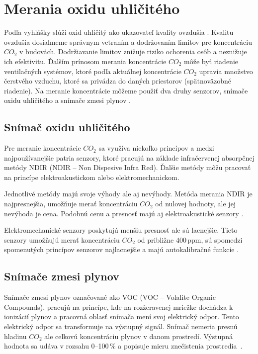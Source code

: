 \chapter{Merania oxidu uhličitého}
Podľa vyhlášky slúži oxid uhličitý ako ukazovateľ kvality ovzdušia \cite{VyhlaskaKvalitaVnutornehoOvzdusiaCO}. Kvalitu ovzdušia dosiahneme správnym vetraním a dodržovaním limitov pre koncentráciu $CO_2$ v budovách. Dodržiavanie limitov znižuje riziko ochorenia osôb a neznižuje ich efektivitu. Ďalším prínosom merania koncentrácie $CO_2$ môže byť riadenie ventilačných systémov, ktoré podľa aktuálnej koncentrácie $CO_2$ upravia množstvo čerstvého vzduchu, ktoré sa privádza do daných priestorov (spätnoväzobné riadenie). Na meranie koncentrácie môžeme použiť dva druhy senzorov, snímače oxidu uhličitého a snímače zmesi plynov \cite{CO2MeraciePristroje}.

\section{Snímač oxidu uhličitého}
 Pre meranie koncentrácie $CO_2$ sa využíva niekoľko princípov a medzi najpoužívanejšie patria senzory, ktoré pracujú na základe infračervenej absorpčnej metódy NDIR (NDIR -- Non Dispesive Infra Red). Ďalšie metódy môžu pracovať na princípe elektroakustickom alebo elektromechanickom. 
 
Jednotlivé metódy majú svoje výhody ale aj nevýhody. Metóda merania NDIR je najpresnejšia, umožňuje merať koncentráciu $CO_2$ od nulovej hodnoty, ale jej nevýhoda je cena. Podobnú cenu a presnosť majú aj elektroakustické senzory \cite{CO2MeraciePristroje}. 

Elektromechanické senzory poskytujú menšiu presnosť ale sú lacnejšie. Tieto senzory umožňujú merať koncentráciu $CO_2$ od približne 400\,ppm, sú spomedzi spomenutých princípov senzorov najlacnejšie a majú autokalibračné funkcie \cite{CO2MeraciePristroje}.
 
 \section{Snímače zmesi plynov}
 Snímače zmesi plynov označované ako VOC (VOC -- Volalite Organic Compounds), pracujú na princípe, kde na rozžeravenej mriežke dochádza k ionizácií plynov a pracovná oblasť snímača mení svoj elektrický odpor. Tento elektrický odpor sa transformuje na výstupný signál. Snímač nemeria presnú hladinu $CO_2$ ale celkovú koncentráciu plynov v danom prostredí. Výstupná hodnota sa udáva v rozsahu 0--100\,\% a popisuje mieru znečistenia prostredia~\cite{CO2MeraciePristroje}.

